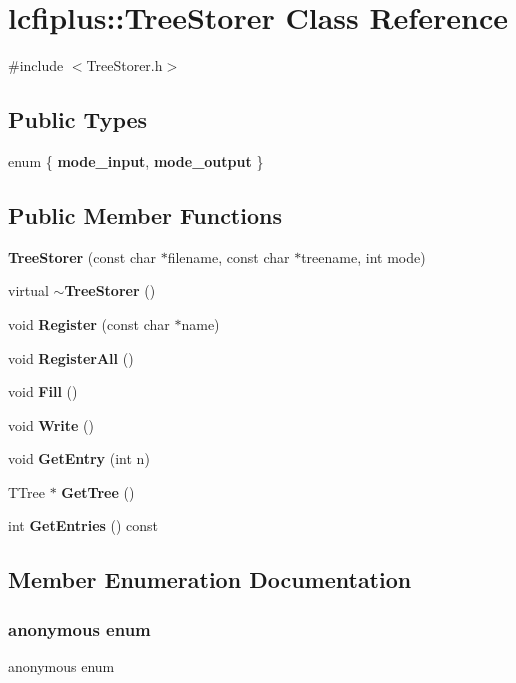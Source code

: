\section{lcfiplus\+:\+:Tree\+Storer Class Reference}
\label{classlcfiplus_1_1TreeStorer}


{\ttfamily \#include $<$Tree\+Storer.\+h$>$}

\subsection*{Public Types}
\begin{DoxyCompactItemize}
\item 
enum \{ \textbf{ mode\+\_\+input}, 
\textbf{ mode\+\_\+output}
 \}
\end{DoxyCompactItemize}
\subsection*{Public Member Functions}
\begin{DoxyCompactItemize}
\item 
\textbf{ Tree\+Storer} (const char $\ast$filename, const char $\ast$treename, int mode)
\item 
virtual \textbf{ $\sim$\+Tree\+Storer} ()
\item 
void \textbf{ Register} (const char $\ast$name)
\item 
void \textbf{ Register\+All} ()
\item 
void \textbf{ Fill} ()
\item 
void \textbf{ Write} ()
\item 
void \textbf{ Get\+Entry} (int n)
\item 
T\+Tree $\ast$ \textbf{ Get\+Tree} ()
\item 
int \textbf{ Get\+Entries} () const
\end{DoxyCompactItemize}


\subsection{Member Enumeration Documentation}
\mbox{\label{classlcfiplus_1_1TreeStorer_a2b1811610d569ece9ec4023e247fee65}} 
\subsubsection{anonymous enum}
{\footnotesize\ttfamily anonymous enum}

